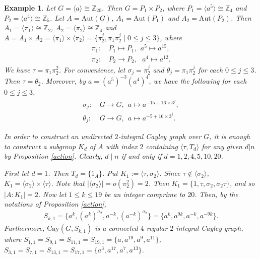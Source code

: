 \documentclass[12pt,a4paper]{article}
\newtheorem{example}{Example}[section]%
\def \leq {\leqslant}
\begin{document}
		\begin{example}
			Let $G=\langle a\rangle\cong\mathbb Z_{20}$. 
			Then $G=P_1\times P_2$, where $P_1=\langle a^{5}\rangle\cong\mathbb Z_4$ and $P_2=\langle a^4\rangle\cong\mathbb Z_{5}$. 
			Let $A=\mathrm{Aut}(G)$, $A_1=\mathrm{Aut}(P_1)$ and $A_2=\mathrm{Aut}(P_2)$. 
			Then $A_1=\langle \pi_1\rangle\cong\mathbb Z_2$, $A_2=\langle \pi_2\rangle\cong\mathbb Z_{4}$ and $A=A_1\times A_2=\langle \pi_1\rangle\times \langle \pi_2\rangle=\{\pi_2^j, \pi_1\pi_2^j\mid 0\leq j\leq 3\}$, where
			\begin{align*}
				\pi_1:&~P_1\mapsto P_1,~~a^{5}\mapsto a^{15},\\		
				\pi_2:&~P_2\rightarrow P_2,~~~a^4\mapsto a^{12}.
			\end{align*}
			We have $\tau=\pi_1\pi_2^2$.
			For convenience, let $\sigma_j=\pi_2^j$ and $\theta_j=\pi_1\pi_2^j$ for each $0\leq j\leq 3$.
			Then $\tau=\theta_{2}$.
			Moreover, by $a=(a^{5})^{-3}(a^4)^{4}$, we have the following for each $0\leq j\leq 3$,
			\begin{align*}
				\sigma_j:~&G\rightarrow G,~~a\mapsto a^{-15+16\times3^j},\\
				\theta_j:~&G\rightarrow G,~~a\mapsto a^{-5+16\times3^j}.
			\end{align*}
			
			In order to construct an undirected $2$-integral Cayley graph over $G$, it is enough to construct a subgroup $K_d$ of $A$ with index $2$ containing $\langle \tau,T_d\rangle$ for any given $d|n$ by Proposition \ref{action}.
			Clearly, $d\mid n$ if and only if $d=1,2,4,5,10,20$.
			
			
			First let $d=1$. Then $T_d=\{1_A\}$. 
			Put $K_1:=\langle \tau,\sigma_2\rangle$. 
			Since $\tau\notin\langle\sigma_2\rangle$, $K_1=\langle\sigma_2\rangle\times\langle\tau\rangle$.
			Note that $|\langle\sigma_2\rangle|=o(\pi_2^2)=2$.
			Then $K_1=\{1,\tau,\sigma_2,\sigma_2\tau\}$, and so $|A:K_1|=2$. 
			Now let
			$1\leq k\leq 19$ be an integer comprime to $20$. Then, by the notations of Proposition \ref{action}, 
			\begin{eqnarray*}
				S_{k,1}=\{a^k,(a^k)^{\sigma_{2}},a^{-k},(a^{-k})^{\sigma_{2}}\}=\{a^k,a^{9k}, a^{-k}, a^{-9k}\}.
			\end{eqnarray*}
			Furthermore, $\mathrm{Cay}(G,S_{k,1})$ is a connected $4$-regular $2$-integral Cayley graph, where
			$S_{1,1}=S_{9,1}=S_{11,1}=S_{19,1}=\{a,a^{19},a^9,a^{11}\}$, $S_{3,1}=S_{7,1}=S_{13,1}=S_{17,1}=\{a^3,a^{17}, a^7,a^{13}\}$.
			

\end{example}
\end{document}
